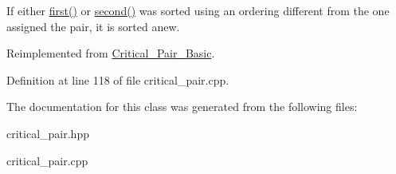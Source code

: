 If either \hyperlink{class_critical___pair___basic_a6e251e3724fde2c610d921f93889eb67}{first()} or \hyperlink{class_critical___pair___basic_a06da1cbbe1451962b68f2bbf90855fae}{second()} was sorted using an ordering different from the one assigned the pair, it is sorted anew. 

Reimplemented from \hyperlink{class_critical___pair___basic_a1bcad730e0bfcf9c833b5fcf0ded468e}{Critical\+\_\+\+Pair\+\_\+\+Basic}.



Definition at line 118 of file critical\+\_\+pair.\+cpp.



The documentation for this class was generated from the following files\+:\begin{DoxyCompactItemize}
\item 
critical\+\_\+pair.\+hpp\item 
critical\+\_\+pair.\+cpp\end{DoxyCompactItemize}
